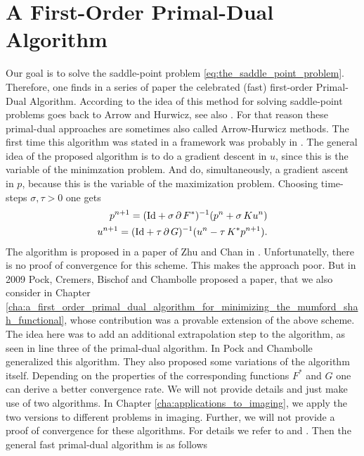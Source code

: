 \section{A First-Order Primal-Dual Algorithm} %
\label{sec:a_firs_order_primal_dual_algorithm}

    Our goal is to solve the saddle-point problem \ref{eq:the_saddle_point_problem}. Therefore, one finds in a series of paper the celebrated (fast) first-order Primal-Dual Algorithm. According to \cite{Chambolle-et-al-10} the idea of this method for solving saddle-point problems goes back to Arrow and Hurwicz, see also \cite{Arrow-Hurwicz}. For that reason these primal-dual approaches are sometimes also called Arrow-Hurwicz methods. The first time this algorithm was stated in a framework was probably in \cite{Appleton-Talbot}. The general idea of the proposed algorithm is to do a gradient descent in $u$, since this is the variable of the minimzation problem. And do, simultaneously, a gradient ascent in $p$, because this is the variable of the maximization problem. Choosing time-steps $\sigma, \tau > 0$ one gets
        \begin{eqnarray}
            p^{n+1} = (\textnormal{Id} + \sigma\,\partial\,F^{\ast})^{-1}(p^{n} + \sigma\,Ku^{n}) \notag \\
            u^{n+1} = (\textnormal{Id} + \tau\,\partial\,G)^{-1}(u^{n} - \tau\,K^{\ast}p^{n+1}). \notag
        \end{eqnarray}
    The algorithm is proposed in a paper of Zhu and Chan in \cite{Zhu-Chan}. Unfortunatelly, there is no proof of convergence for this scheme. This makes the approach poor. But in 2009 Pock, Cremers, Bischof and Chambolle proposed a paper, that we also consider in Chapter \ref{cha:a_first_order_primal_dual_algorithm_for_minimizing_the_mumford_shah_functional}, whose contribution was a provable extension of the above scheme. The idea here was to add an additional extrapolation step to the algorithm, as seen in line three of the primal-dual algorithm. In \cite{Chambolle10afirst-order} Pock and Chambolle generalized this algorithm. They also proposed some variations of the algorithm itself. Depending on the properties of the corresponding functions $F^{\ast}$ and $G$ one can derive a better convergence rate. We will not provide details and just make use of two algorithms. In Chapter \ref{cha:applications_to_imaging}, we apply the two versions to different problems in imaging. Further, we will not provide a proof of convergence for these algorithms. For details we refer to \cite{Chambolle10afirst-order} and \cite{Pock-et-al-iccv09}. Then the general fast primal-dual algorithm is as follows

